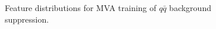 \begin{figure}[!htb]
\caption{Feature distributions for MVA training of $q\bar q$ background suppression.}
\end{figure}

